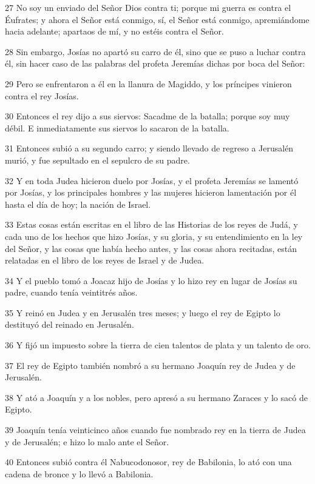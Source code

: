 \par 27 No soy un enviado del Señor Dios contra ti; porque mi guerra es contra el Éufrates; y ahora el Señor está conmigo, sí, el Señor está conmigo, apremiándome hacia adelante; apartaos de mí, y no estéis contra el Señor.
\par 28 Sin embargo, Josías no apartó su carro de él, sino que se puso a luchar contra él, sin hacer caso de las palabras del profeta Jeremías dichas por boca del Señor:
\par 29 Pero se enfrentaron a él en la llanura de Magiddo, y los príncipes vinieron contra el rey Josías.
\par 30 Entonces el rey dijo a sus siervos: Sacadme de la batalla; porque soy muy débil. E inmediatamente sus siervos lo sacaron de la batalla.
\par 31 Entonces subió a su segundo carro; y siendo llevado de regreso a Jerusalén murió, y fue sepultado en el sepulcro de su padre.
\par 32 Y en toda Judea hicieron duelo por Josías, y el profeta Jeremías se lamentó por Josías, y los principales hombres y las mujeres hicieron lamentación por él hasta el día de hoy; la nación de Israel.
\par 33 Estas cosas están escritas en el libro de las Historias de los reyes de Judá, y cada uno de los hechos que hizo Josías, y su gloria, y su entendimiento en la ley del Señor, y las cosas que había hecho antes, y las cosas ahora recitadas, están relatadas en el libro de los reyes de Israel y de Judea.
\par 34 Y el pueblo tomó a Joacaz hijo de Josías y lo hizo rey en lugar de Josías su padre, cuando tenía veintitrés años.
\par 35 Y reinó en Judea y en Jerusalén tres meses; y luego el rey de Egipto lo destituyó del reinado en Jerusalén.
\par 36 Y fijó un impuesto sobre la tierra de cien talentos de plata y un talento de oro.
\par 37 El rey de Egipto también nombró a su hermano Joaquín rey de Judea y de Jerusalén.
\par 38 Y ató a Joaquín y a los nobles, pero apresó a su hermano Zaraces y lo sacó de Egipto.
\par 39 Joaquín tenía veinticinco años cuando fue nombrado rey en la tierra de Judea y de Jerusalén; e hizo lo malo ante el Señor.
\par 40 Entonces subió contra él Nabucodonosor, rey de Babilonia, lo ató con una cadena de bronce y lo llevó a Babilonia.
